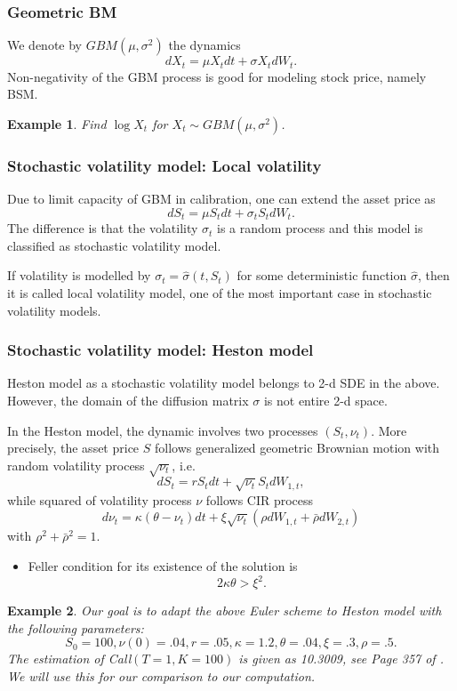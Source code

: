 \documentclass{article}
\newtheorem{example}{Example}
\begin{document}
\subsubsection{Geometric BM}
We denote by $GBM(\mu, \sigma^2)$ the dynamics
$$d X_t = \mu X_t dt + \sigma X_t dW_t.$$
Non-negativity of the GBM process is good for modeling stock price, namely BSM.
\begin{example}
\label{exm:gbm01}
Find $\log X_t$ for $X_t \sim GBM(\mu, \sigma^2)$.
\end{example}

\subsubsection{Stochastic volatility model: Local volatility}
Due to limit capacity of GBM in calibration, one can extend the asset price as
$$d S_t = \mu S_t dt + \sigma_t S_t dW_t.$$
The difference is that the volatility $\sigma_t$ is a random process and this model is classified as stochastic volatility model.

If volatility is modelled by $\sigma_t = \hat \sigma(t, S_t)$ for some deterministic function $\hat \sigma$, then it is called local volatility model, one of the most important case in stochastic volatility models.
\subsubsection{Stochastic volatility model: Heston model}
Heston model as a stochastic volatility model belongs to 2-d SDE in the above. However, the domain of the diffusion matrix $\sigma$ is not entire 2-d space. 

In the Heston model, the dynamic involves two processes $(S_{t}, \nu_{t})$.
More precisely, the asset price $S$ follows generalized geometric Brownian motion with random volatility process $\sqrt{\nu_{t}}$, i.e.  
$$d S_{t} = r S_{t} dt + \sqrt{\nu_{t}} S_{t} dW_{1,t},$$
while squared of volatility process $\nu$ follows CIR process
$$ d \nu_{t} = \kappa (\theta - \nu_{t}) dt + \xi \sqrt{\nu_{t}} (\rho dW_{1,t} + 
\bar \rho d W_{2,t})$$
with $\rho^{2} + \bar \rho^{2} = 1.$ 

\begin{itemize}
\item
Feller condition for its existence of the solution is
$$2\kappa \theta > \xi^{2}.$$
\end{itemize}


\begin{example}
\label{exm:heston01}
Our goal is to adapt the above Euler scheme to Heston model with the following parameters:
$$ S_{0} = 100, \nu(0) = .04, r = .05, \kappa = 1.2, 
\theta = .04, \xi = .3, \rho = .5.$$
The estimation of Call$(T =1, K = 100)$ is given as 10.3009, see Page 357 of \cite{Gla04}. We will use this for our comparison to our computation.
\end{example}
\end{document}
